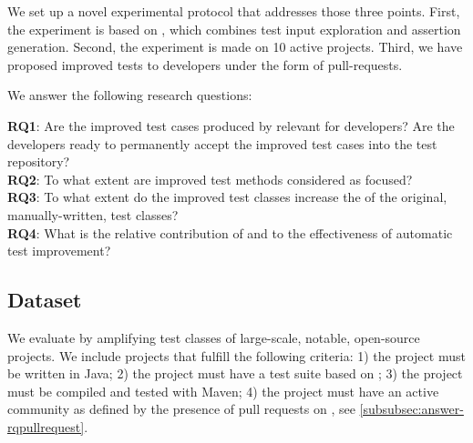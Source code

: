 We set up a novel experimental protocol that addresses those three points.
First, the experiment is based on \dspot, which combines test input exploration and assertion generation.
Second, the experiment is made on 10 active \gh projects.
Third, we have proposed improved tests to developers under the form of pull-requests.

We answer the following research questions:

\newcommand\rqpullrequest{RQ1\xspace}
\newcommand\rqcandidates{RQ2\xspace}
\newcommand\rqeffectiveness{RQ3\xspace}
\newcommand\rqAmplVersusIAmpl{RQ4\xspace}

\noindent\textbf{\rqpullrequest}: Are the improved test cases produced by \dspot relevant for developers? Are the developers ready to permanently accept the improved test cases into the test repository?\\
\textbf{\rqcandidates}: To what extent are improved test methods considered as focused?\\
\textbf{\rqeffectiveness}: To what extent do the improved test classes increase the \ms of the original,  manually-written, test classes?\\
\textbf{\rqAmplVersusIAmpl}: What is the relative contribution of \Iampl{} and \Aampl{} to the effectiveness of automatic test improvement?\\

\subsection{Dataset}
\label{subsec:dataset}

We evaluate \dspot by amplifying test classes of large-scale, notable, open-source projects. We include projects that fulfill the following criteria:  
1) the project must be written in Java; 
2) the project must have a test suite based on \junit;
3) the project must be compiled and tested with Maven;
4) the project must have an active community as defined by the presence of pull requests on \gh, see \autoref{subsubsec:answer-rqpullrequest}. 

